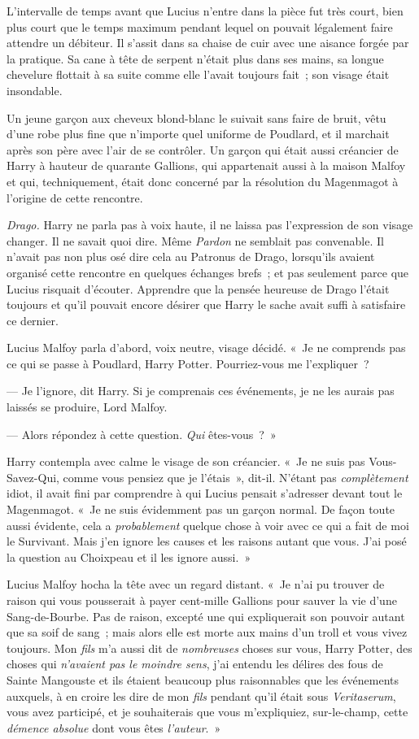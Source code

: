 L'intervalle de temps avant que Lucius n'entre dans la pièce fut très court, bien plus court que le temps maximum pendant lequel on pouvait légalement faire attendre un débiteur. Il s'assit dans sa chaise de cuir avec une aisance forgée par la pratique. Sa cane à tête de serpent n'était plus dans ses mains, sa longue chevelure flottait à sa suite comme elle l'avait toujours fait~; son visage était insondable.

Un jeune garçon aux cheveux blond-blanc le suivait sans faire de bruit, vêtu d'une robe plus fine que n'importe quel uniforme de Poudlard, et il marchait après son père avec l'air de se contrôler. Un garçon qui était aussi créancier de Harry à hauteur de quarante Gallions, qui appartenait aussi à la maison Malfoy et qui, techniquement, était donc concerné par la résolution du Magenmagot à l'origine de cette rencontre.

\emph{Drago.} Harry ne parla pas à voix haute, il ne laissa pas l'expression de son visage changer. Il ne savait quoi dire. Même \emph{Pardon} ne semblait pas convenable. Il n'avait pas non plus osé dire cela au Patronus de Drago, lorsqu'ils avaient organisé cette rencontre en quelques échanges brefs~; et pas seulement parce que Lucius risquait d'écouter. Apprendre que la pensée heureuse de Drago l'était toujours et qu'il pouvait encore désirer que Harry le sache avait suffi à satisfaire ce dernier.

Lucius Malfoy parla d'abord, voix neutre, visage décidé. «~Je ne comprends pas ce qui se passe à Poudlard, Harry Potter. Pourriez-vous me l'expliquer~?

--- Je l'ignore, dit Harry. Si je comprenais ces événements, je ne les aurais pas laissés se produire, Lord Malfoy.

--- Alors répondez à cette question. \emph{Qui} êtes-vous~?~»

Harry contempla avec calme le visage de son créancier. «~Je ne suis pas Vous-Savez-Qui, comme vous pensiez que je l'étais~», dit-il. N'étant pas \emph{complètement} idiot, il avait fini par comprendre à qui Lucius pensait s'adresser devant tout le Magenmagot. «~Je ne suis évidemment pas un garçon normal. De façon toute aussi évidente, cela a \emph{probablement} quelque chose à voir avec ce qui a fait de moi le Survivant. Mais j'en ignore les causes et les raisons autant que vous. J'ai posé la question au Choixpeau et il les ignore aussi.~»

Lucius Malfoy hocha la tête avec un regard distant. «~Je n'ai pu trouver de raison qui vous pousserait à payer cent-mille Gallions pour sauver la vie d'une Sang-de-Bourbe. Pas de raison, excepté une qui expliquerait son pouvoir autant que sa soif de sang~; mais alors elle est morte aux mains d'un troll et vous vivez toujours. Mon \emph{fils} m'a aussi dit de \emph{nombreuses} choses sur vous, Harry Potter, des choses qui \emph{n'avaient pas le moindre sens}, j'ai entendu les délires des fous de Sainte Mangouste et ils étaient beaucoup plus raisonnables que les événements auxquels, à en croire les dire de mon \emph{fils} pendant qu'il était sous \emph{Veritaserum}, vous avez participé, et je souhaiterais que vous m'expliquiez, sur-le-champ, cette \emph{démence absolue} dont vous êtes \emph{l'auteur}.~»

